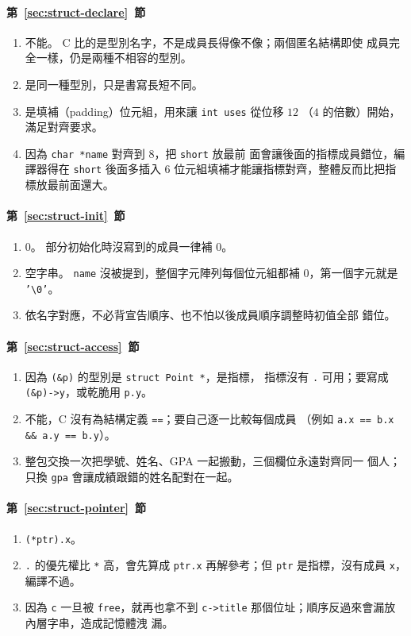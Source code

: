 \paragraph{第~\ref{sec:struct-declare}~節}
\begin{enumerate}
\item 不能。 C 比的是型別名字，不是成員長得像不像；兩個匿名結構即使
成員完全一樣，仍是兩種不相容的型別。
\item 是同一種型別，只是書寫長短不同。
\item 是填補（padding）位元組，用來讓 \texttt{int uses} 從位移 $12$
（$4$ 的倍數）開始，滿足對齊要求。
\item 因為 \texttt{char *name} 對齊到 $8$，把 \texttt{short} 放最前
面會讓後面的指標成員錯位，編譯器得在 \texttt{short} 後面多插入 $6$
位元組填補才能讓指標對齊，整體反而比把指標放最前面還大。
\end{enumerate}

\paragraph{第~\ref{sec:struct-init}~節}
\begin{enumerate}
\item $0$。 部分初始化時沒寫到的成員一律補 $0$。
\item 空字串。 \texttt{name} 沒被提到，整個字元陣列每個位元組都補
$0$，第一個字元就是 \texttt{'\textbackslash 0'}。
\item 依名字對應，不必背宣告順序、也不怕以後成員順序調整時初值全部
錯位。
\end{enumerate}

\paragraph{第~\ref{sec:struct-access}~節}
\begin{enumerate}
\item 因為 \texttt{(\&p)} 的型別是 \texttt{struct Point *}，是指標，
指標沒有 \texttt{.} 可用；要寫成 \texttt{(\&p)->y}，或乾脆用
\texttt{p.y}。
\item 不能，C 沒有為結構定義 \texttt{==}；要自己逐一比較每個成員
（例如 \texttt{a.x == b.x \&\& a.y == b.y}）。
\item 整包交換一次把學號、姓名、GPA 一起搬動，三個欄位永遠對齊同一
個人；只換 \texttt{gpa} 會讓成績跟錯的姓名配對在一起。
\end{enumerate}

\paragraph{第~\ref{sec:struct-pointer}~節}
\begin{enumerate}
\item \texttt{(*ptr).x}。
\item \texttt{.} 的優先權比 \texttt{*} 高，會先算成 \texttt{ptr.x}
再解參考；但 \texttt{ptr} 是指標，沒有成員 \texttt{x}，編譯不過。
\item 因為 \texttt{c} 一旦被 \texttt{free}，就再也拿不到
\texttt{c->title} 那個位址；順序反過來會漏放內層字串，造成記憶體洩
漏。
\end{enumerate}

